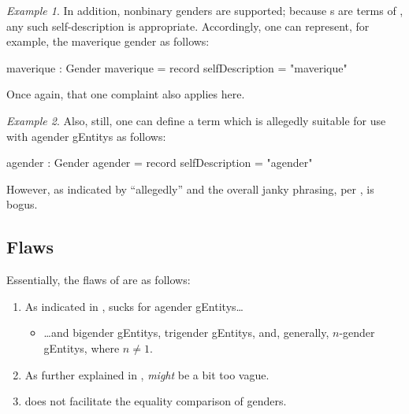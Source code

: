 \documentclass{article}
\theoremstyle{remark}
\newtheorem{example}{Example}
\begin{document}
\begin{example}
  In addition, nonbinary genders are supported; because s are terms of , any such self-description is appropriate.  Accordingly, one can represent, for example, the maverique gender\cite{nonbinaryWikiMaverique} as follows:

  \begin{code}
    maverique : Gender
    maverique = record {selfDescription = "maverique"}
  \end{code}

Once again, that one  complaint also applies here.
\end{example}

\begin{example}
  Also, still, one can define a  term which is allegedly suitable for use with agender \glspl{gEntity} as follows:

  \begin{code}
    agender : Gender
    agender = record {selfDescription = "agender"}
  \end{code}

  However, as indicated by ``allegedly'' and the overall janky phrasing, per ,  is bogus.
\end{example}

\subsection{Flaws}\label{sec:gender1flaws}
Essentially, the flaws of  are as follows:

\begin{enumerate}
  \item As indicated in ,  sucks for agender \glspl{gEntity}\ldots{}\label{enum:gender1agender}
  \begin{itemize}
    \item \ldots and bigender \glspl{gEntity}, trigender \glspl{gEntity}, and, generally, \(n\)-gender \glspl{gEntity}, where \(n \neq 1\).
  \end{itemize}
  \item As further explained in ,  \emph{might} be a bit too vague.
  \item {} does not facilitate the equality comparison of genders.\label{enum:gender1stringComparison}
\end{enumerate}
\end{document}
